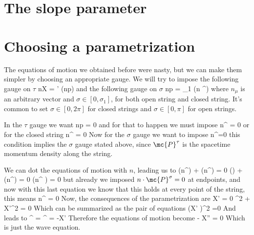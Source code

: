 \documentclass[oneside, 12pt]{book}
\begin{document}
\section{The slope parameter}

\section{Choosing a parametrization}

The equations of motion we obtained before were nasty, but we can make them simpler by choosing an appropriate gauge. We will try to impose the following gauge on \(\tau\)
\beq[] n\cdot X = \alpha' (n\cdot p) \tau \eeq
and the following gauge on \( \sigma\)
\beq[] n\cdot p = \sigma_1 \left(n \cdot {}^{\tau}\right)\eeq
where \( n_{\mu}\) is an arbitrary vector and \( \sigma \in [0,\sigma_1]\), for both open string and closed string. It's common to set \( \sigma \in [0,2\pi]\) for closed strings and \(\sigma \in [0,\pi]\) for open strings.\par

In the \(\tau\) gauge we want 
\beq[] \dv{\tau} n\cdot p = 0\eeq
and for that to happen we must impose
\beq[] n\cdot {}^{\sigma} = 0\eeq
or for the closed string
\beq[] n\cdot {}^{\sigma} = 0 \eeq
Now for the \(\sigma\) gauge we want to impose
\beq[] \dv{\sigma}n\cdot {}^{\tau}=0 \eeq
this condition implies the \(\sigma\) gauge stated above, since \( \mc{P}^{\tau}\) is the spacetime momentum density along the string.\par 

We can dot the equations of motion with \(n\), leading us to
\beq[] \pdv{\tau}\left(n\cdot {}^{\tau}\right) + \pdv{\sigma}\left(n\cdot{}^{\sigma}\right)  = 0\eeq
\beq[] \pdv{\tau}\left(\right) + \pdv{\sigma}\left(n\cdot{}^{\sigma}\right)  = 0 \eeq
\beq[] \pdv{\sigma} \left(n\cdot {}^{\sigma} \right) = 0\eeq
but already we imposed \( n\cdot \mc{P}^{\sigma} = 0\) at endpoints, and now with this last equation we know that this holds at every point of the string, this means
\beq[] n\cdot {}^{\sigma} = 0  \sigma \in [0,\sigma_1]\eeq
Now, the consequences of the parametrization are
\beq[] \cdot X' = 0  ^2 + X'^2 = 0\eeq
Which can be summarized as the pair of equations
\beq[] \left(\pm X' \right)^2 =0 \eeq
And leads to
\beq[] ^{\tau} =   ^{\sigma} = -X'\eeq
Therefore the equations of motion become
\beq[]  - X'' = 0\eeq
Which is just the wave equation.\par 
\end{document}
